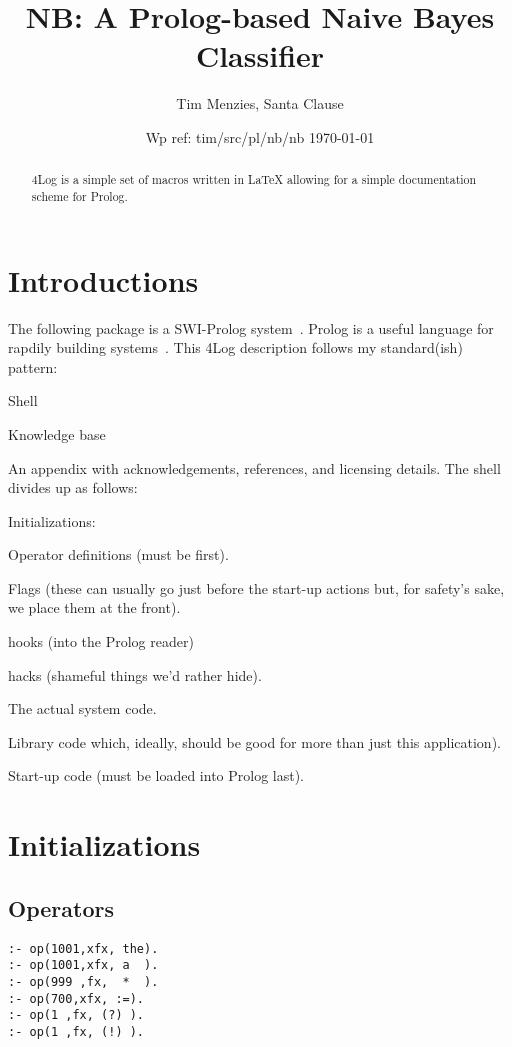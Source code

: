 \documentclass[twocolumn,global]{svjour}
\date{Wp ref: tim/src/pl/nb/nb \today}
\newcommand{\ME}{NB}
\begin{document}
\title{\ME: A Prolog-based Naive Bayes Classifier}
\author{Tim Menzies, Santa Clause}
\institute{}
\maketitle
\thispagestyle{empty}\pagestyle{plain}
 \begin{abstract}
{\Tex4Log} is a simple
set of macros written in {\LaTeX} allowing
for a simple documentation
scheme for Prolog.
\end{abstract}
\setcounter{tocdepth}{4}
\tableofcontents
\listoffigures
\newpage

\section{ Introductions
}
 The following package is a SWI-Prolog system~\cite{swiprolog}.
Prolog is a useful language for rapdily building
systems~\cite{der96,me89zb,bratko01,ok90,sterling94}.
This {\Tex4Log}
description  follows my standard(ish) pattern:
\bi
\item
Shell
\item Knowledge base
\item
An appendix with acknowledgements, references, and licensing details.
\ei
The shell divides up as follows:
\bi
\item Initializations:
\bi
\item
Operator definitions (must be first).
\item
Flags (these can usually go just before the start-up
actions but, for safety's sake, we place them at the
front).
\item
hooks (into the Prolog reader)
\item
hacks (shameful things we'd rather hide).
\ei
\item
The actual system code.
\item
Library code which, ideally,
should be good for more than just this application).
\item
Start-up code (must be loaded into Prolog last).
\ei

\section{ Initializations
}
\subsection{ Operators }\begin{Verbatim}
:- op(1001,xfx, the).
:- op(1001,xfx, a  ).
:- op(999 ,fx,  *  ).
:- op(700,xfx, :=).
:- op(1 ,fx, (?) ).
:- op(1 ,fx, (!) ).
\end{Verbatim}
\end{document}
